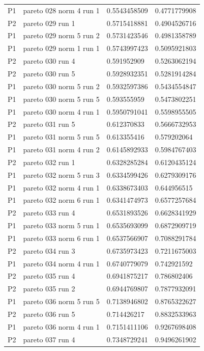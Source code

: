 \begin{tabular}{@{}llll@{}}
P1 & pareto 028 norm 4 run 1 & 0.5543458509 & 0.4771779908 \\
P2 & pareto 029 run 1 & 0.5715418881 & 0.4904526716 \\
P1 & pareto 029 norm 5 run 2 & 0.5731423546 & 0.4981358789 \\
P1 & pareto 029 norm 1 run 1 & 0.5743997423 & 0.5095921803 \\
P2 & pareto 030 run 4 & 0.591952909 & 0.5263062194 \\
P2 & pareto 030 run 5 & 0.5928932351 & 0.5281914284 \\
P1 & pareto 030 norm 5 run 2 & 0.5932597386 & 0.5434554847 \\
P1 & pareto 030 norm 5 run 5 & 0.593555959 & 0.5473802251 \\
P1 & pareto 030 norm 4 run 1 & 0.5950791041 & 0.5598955505 \\
P2 & pareto 031 run 5 & 0.612370833 & 0.5666732953 \\
P1 & pareto 031 norm 5 run 5 & 0.613355416 & 0.579202064 \\
P1 & pareto 031 norm 4 run 2 & 0.6145892933 & 0.5984767403 \\
P2 & pareto 032 run 1 & 0.6328285284 & 0.6120435124 \\
P1 & pareto 032 norm 5 run 3 & 0.6334599426 & 0.6279309176 \\
P1 & pareto 032 norm 4 run 1 & 0.6338673403 & 0.644956515 \\
P1 & pareto 032 norm 6 run 1 & 0.6341474973 & 0.6577257684 \\
P2 & pareto 033 run 4 & 0.6531893526 & 0.6628341929 \\
P1 & pareto 033 norm 5 run 1 & 0.6535693099 & 0.6872909719 \\
P1 & pareto 033 norm 6 run 1 & 0.6537566907 & 0.7088291784 \\
P2 & pareto 034 run 3 & 0.6735973423 & 0.7211675003 \\
P1 & pareto 034 norm 4 run 1 & 0.6740779079 & 0.742921592 \\
P2 & pareto 035 run 4 & 0.6941875217 & 0.786802406 \\
P2 & pareto 035 run 2 & 0.6944769807 & 0.7877932091 \\
P1 & pareto 036 norm 5 run 5 & 0.7138946802 & 0.8765322627 \\
P2 & pareto 036 run 5 & 0.714426217 & 0.8832533963 \\
P1 & pareto 036 norm 4 run 1 & 0.7151411106 & 0.9267698408 \\
P2 & pareto 037 run 4 & 0.7348729241 & 0.9496261902 \\

\end{tabular}
